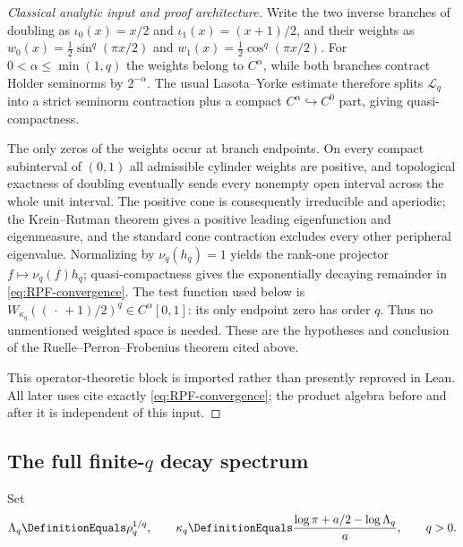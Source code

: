 \documentclass[11pt,oneside]{article}
\numberwithin{equation}{section}
\theoremstyle{definition}
\theoremstyle{remark}
\newcommand{\DoublingInverseBranch}[1]{\iota_{#1}}
\begin{document}
\begin{proof}[Classical analytic input and proof architecture]
Write the two inverse branches of doubling as
$\DoublingInverseBranch{0}(x)=x/2$ and
$\DoublingInverseBranch{1}(x)=(x+1)/2$, and their weights as
$w_0(x)=\tfrac12\sin^q(\pi x/2)$ and
$w_1(x)=\tfrac12\cos^q(\pi x/2)$.  For
$0<\alpha\le\min(1,q)$ the weights belong to $C^\alpha$, while both branches contract
Holder seminorms by $2^{-\alpha}$.  The usual Lasota--Yorke estimate therefore splits
$\mathcal L_q$ into a strict seminorm contraction plus a compact $C^\alpha\hookrightarrow
C^0$ part, giving quasi-compactness.

The only zeros of the weights occur at branch endpoints.  On every compact subinterval of
$(0,1)$ all admissible cylinder weights are positive, and topological exactness of doubling
eventually sends every nonempty open interval across the whole unit interval.  The positive
cone is consequently irreducible and aperiodic; the Krein--Rutman theorem gives a positive
leading eigenfunction and eigenmeasure, and the standard cone contraction excludes every
other peripheral eigenvalue.  Normalizing by $\nu_q(h_q)=1$ yields the rank-one projector
$f\mapsto\nu_q(f)h_q$; quasi-compactness gives the exponentially decaying remainder in
\eqref{eq:RPF-convergence}.  The test function used below is
$W_{\kappa_q}((\,\cdot\,+1)/2)^q\in C^\alpha[0,1]$: its only endpoint zero has order $q$.
Thus no unmentioned weighted space is needed.  These are the hypotheses and conclusion of
the Ruelle--Perron--Frobenius theorem cited above.

This operator-theoretic block is imported rather than presently reproved in Lean.  All
later uses cite exactly \eqref{eq:RPF-convergence}; the product algebra before and after it
is independent of this input.
\end{proof}

\subsection{The full finite-\texorpdfstring{$q$}{q} decay spectrum}

Set
\begin{equation}
 \Lambda_q\DefinitionEquals\rho_q^{1/q},
 \qquad
 \kappa_q\DefinitionEquals\frac{\log\pi+a/2-\log\Lambda_q}{a},
 \qquad q>0.
 \label{eq:kappa-q}
\end{equation}
\end{document}
